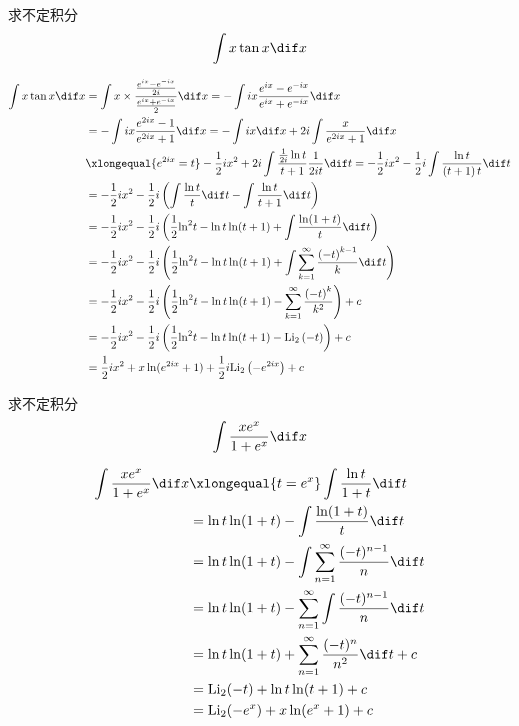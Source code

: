 \documentclass[color=green,titlestyle=hang]{elegantbook}%
\begin{document}
\newpage\begin{exercise}求不定积分\[\int {x\tan x} \dif x\]
\end{exercise}\begin{Solution}\begin{align*}
\int {x\tan x} \dif x &=\int {x \times \frac{{\frac{{{e^{ix}} - {e^{ - ix}}}}{{2i}}}}{{\frac{{{e^{ix}} + {e^{ - ix}}}}{2}}}} \dif x=  - \int {ix\frac{{{e^{ix}} - {e^{ - ix}}}}{{{e^{ix}} + {e^{ - ix}}}}} \dif x\\
&=  - \int {ix\frac{{{e^{2ix}} - 1}}{{{e^{2ix}} + 1}}} \dif x =  - \int {ix} \dif x + 2i\int {\frac{x}{{{e^{2ix}} + 1}}} \dif x\\
&\xlongequal{e^{2ix}= t}
- \frac{1}{2}i{x^2} + 2i\int {\frac{{\frac{1}{{2i}}\ln t}}{{t + 1}}} \frac{1}{{2it}}\dif t =  - \frac{1}{2}i{x^2} - \frac{1}{2}i\int {\frac{{\ln t}}{{\left( {t + 1} \right)t}}} \dif t\\
&=  - \frac{1}{2}i{x^2} - \frac{1}{2}i\left( {\int {\frac{{\ln t}}{t}} \dif t - \int {\frac{{\ln t}}{{t + 1}}} \dif t} \right)\\
&=  - \frac{1}{2}i{x^2} - \frac{1}{2}i\left( {\frac{1}{2}{{\ln }^2}t - \ln t\ln (t + 1) + \int {\frac{{\ln (1 + t)}}{t}} \dif t} \right)\\
&=  - \frac{1}{2}i{x^2} - \frac{1}{2}i\left( {\frac{1}{2}{{\ln }^2}t - \ln t\ln (t + 1) + \int {\sum\limits_{k = 1}^\infty  {\frac{{{{\left( { - t} \right)}^{k - 1}}}}{k}} } \dif t} \right)\\
& =  - \frac{1}{2}i{x^2} - \frac{1}{2}i\left( {\frac{1}{2}{{\ln }^2}t - \ln t\ln (t + 1) - \sum\limits_{k = 1}^\infty  {\frac{{{{( - t)}^k}}}{{{k^2}}}} } \right) + c\\
&  =  - \frac{1}{2}i{x^2} - \frac{1}{2}i\left( {\frac{1}{2}{{\ln }^2}t - \ln t\ln (t + 1) -\mathrm{Li}_2\left( { - t} \right)} \right) + c\\
&= \frac{1}{2}i{x^2} + x\ln ({e^{2ix}} + 1) + \frac{1}{2}i\mathrm{Li}_2\left( { - {e^{2ix}}} \right) + c
\end{align*}
\end{Solution}

\begin{exercise}求不定积分\[\int\frac{xe^x}{1+e^x}\dif x\]
\end{exercise}\begin{Solution}\begin{align*}\int\frac{xe^x}{1+e^x}\dif x
&\xlongequal{t=e^x}\int\frac{\ln t }{1+t}\dif t\\
&=\ln t\ln(1+t)-\int\frac{\ln(1+t)}{t}\dif t\\
&=\ln t\ln(1+t)-\int\sum_{n=1}^{\infty}\frac{(-t)^{n-1}}{n}\dif t\\
&=\ln t\ln(1+t)-\sum_{n=1}^{\infty}\int\frac{(-t)^{n-1}}{n}\dif t\\
&=\ln t\ln(1+t)+\sum_{n=1}^{\infty}\frac{(-t)^n}{n^2}\dif t+c\\
&=\textrm{Li}_2(-t)+\ln t\ln(t+1)+c\\
&=\textrm{Li}_2(-e^x)+x\ln(e^x+1)+c\\
\end{align*}
\end{Solution}
\end{document}
